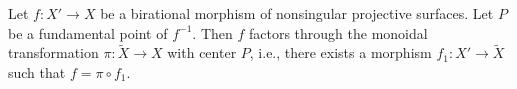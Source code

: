 Let $f: X' \rightarrow X$ be a birational morphism of nonsingular projective surfaces. Let $P$ be a fundamental point of $f^{-1}$. Then $f$ factors through the monoidal transformation $\pi: \tilde{X} \rightarrow X$ with center $P$, i.e., there exists a morphism $f_1: X' \rightarrow \tilde{X}$ such that $f = \pi \circ f_1$.
